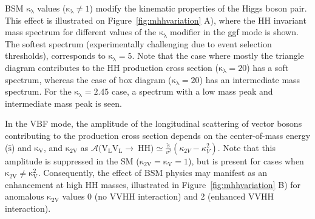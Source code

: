 BSM $\mathrm{\kappa_{\lambda}}$ values ($\mathrm{\kappa_{\lambda}\neq1}$)  modify the kinematic properties of the Higgs boson pair. This effect is illustrated on Figure~\ref{fig:mhhvariation} A), where the HH invariant mass spectrum for different values of the $\mathrm{\kappa_{\lambda}}$ modifier in the ggf mode is shown. The softest spectrum (experimentally challenging due to event selection thresholds), corresponds to $\mathrm{\kappa_{\lambda}=5}$. Note that the case where mostly the triangle diagram contributes to the HH production cross section ($\mathrm{\kappa_{\lambda}=20}$) has a soft spectrum, whereas the case of box diagram ($\mathrm{\kappa_{\lambda}=20}$) has an intermediate mass spectrum. For the $\mathrm{\kappa_{\lambda}=2.45}$ case, a spectrum with a low mass peak and intermediate mass peak is seen.

In the VBF mode, the amplitude of the longitudinal scattering of vector bosons contributing to the production cross section depends on the center-of-mass energy ($\mathrm{\hat{s}}$) and $\mathrm{\kappa_{V}}$, and $\mathrm{\kappa_{2V}}$ as $\mathcal{A}(\mathrm{V_{L}V_{L}\rightarrow~HH)}\simeq \frac{\mathrm{\hat{s}}}{v^{2}}(\kappa_{2V}-\kappa_{V}^{2})$. Note that this amplitude is suppressed in the SM ($\mathrm{\kappa_{2V}=\kappa_{V}=1}$), but is present for cases when $\mathrm{\kappa_{2V}\neq\kappa_{V}^{2}}$. Consequently, the effect of BSM physics may manifest as an enhancement at high HH masses, illustrated in Figure~\ref{fig:mhhvariation} B) for anomalous $\mathrm{\kappa_{2V}}$ values 0 (no VVHH interaction) and 2 (enhanced VVHH interaction).

